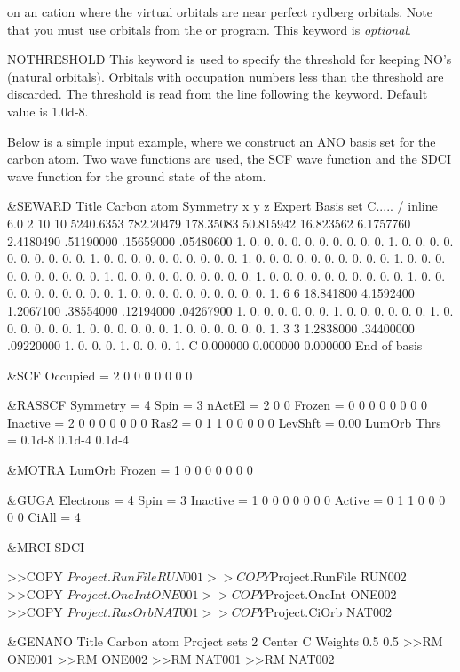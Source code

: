 \begin{keywordlist}
on an cation where the virtual orbitals are near perfect
rydberg orbitals.
Note that you must use orbitals from the
 or
 program.
This keyword is {\it optional}.
\item[NOTHRESHOLD]
This keyword is used to specify the threshold for
keeping NO's (natural orbitals). Orbitals with
occupation numbers less than the threshold are
discarded. The threshold is read from the line
following the keyword. Default value is 1.0d-8.
\end{keywordlist}

Below is a simple input example, where we construct an
ANO basis set for the carbon atom.
Two wave functions are used, the SCF wave function and the
SDCI wave function for the ground state of the atom.

\begin{inputlisting}
 &SEWARD
Title
 Carbon atom
Symmetry
x y z
Expert
Basis set
C..... / inline
  6.0 2
   10   10
5240.6353 782.20479 178.35083 50.815942 16.823562 6.1757760 2.4180490
.51190000 .15659000 .05480600
1. 0. 0. 0. 0. 0. 0. 0. 0. 0.
0. 1. 0. 0. 0. 0. 0. 0. 0. 0.
0. 0. 1. 0. 0. 0. 0. 0. 0. 0.
0. 0. 0. 1. 0. 0. 0. 0. 0. 0.
0. 0. 0. 0. 1. 0. 0. 0. 0. 0.
0. 0. 0. 0. 0. 1. 0. 0. 0. 0.
0. 0. 0. 0. 0. 0. 1. 0. 0. 0.
0. 0. 0. 0. 0. 0. 0. 1. 0. 0.
0. 0. 0. 0. 0. 0. 0. 0. 1. 0.
0. 0. 0. 0. 0. 0. 0. 0. 0. 1.
    6    6
18.841800 4.1592400 1.2067100 .38554000 .12194000 .04267900
1. 0. 0. 0. 0. 0.
0. 1. 0. 0. 0. 0.
0. 0. 1. 0. 0. 0.
0. 0. 0. 1. 0. 0.
0. 0. 0. 0. 1. 0.
0. 0. 0. 0. 0. 1.
    3    3
1.2838000 .34400000 .09220000
1. 0. 0.
0. 1. 0.
0. 0. 1.
C  0.000000  0.000000  0.000000
End of basis

 &SCF
Occupied =  2 0 0 0 0 0 0 0

 &RASSCF
Symmetry =  4
Spin     =  3
nActEl   =  2 0 0
Frozen   =  0 0 0 0 0 0 0 0
Inactive =  2 0 0 0 0 0 0 0
Ras2     =  0 1 1 0 0 0 0 0
LevShft  =  0.00
LumOrb
Thrs     =  0.1d-8 0.1d-4 0.1d-4

 &MOTRA
LumOrb
Frozen   =  1 0 0 0 0 0 0 0

 &GUGA
Electrons =  4
Spin      =  3
Inactive  =  1 0 0 0 0 0 0 0
Active    =  0 1 1 0 0 0 0 0
CiAll     =  4

 &MRCI
SDCI

>>COPY $Project.RunFile RUN001
>>COPY $Project.RunFile RUN002
>>COPY $Project.OneInt  ONE001
>>COPY $Project.OneInt  ONE002
>>COPY $Project.RasOrb  NAT001
>>COPY $Project.CiOrb   NAT002

 &GENANO
Title
 Carbon atom
Project
sets
 2
Center
C
Weights
 0.5 0.5
>>RM ONE001
>>RM ONE002
>>RM NAT001
>>RM NAT002
\end{inputlisting}

